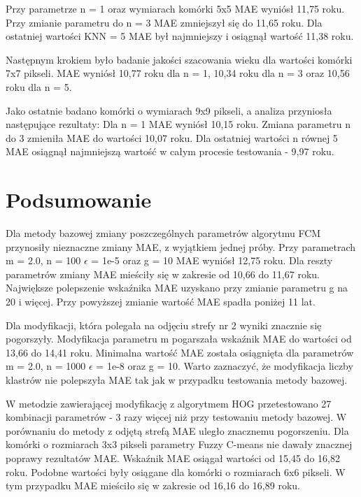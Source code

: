 \documentclass[a4paper,twoside,12pt]{book}
\begin{document}
    Przy parametrze n = 1 oraz wymiarach komórki 5x5 MAE wyniósł 11,75 roku. Przy zmianie parametru do n = 3 MAE
    zmniejszył się do 11,65 roku. Dla ostatniej wartości KNN = 5 MAE był najmniejszy i osiągnął wartość 11,38 roku.

    Następnym krokiem było badanie jakości szacowania wieku dla wartości komórki 7x7 pikseli.
    MAE wyniósł 10,77 roku dla n = 1, 10,34 roku dla n = 3 oraz 10,56 roku dla n = 5.

    Jako ostatnie badano komórki o wymiarach 9x9 pikseli, a analiza przyniosła następujące rezultaty:
    Dla n = 1 MAE wyniósł 10,15 roku. Zmiana parametru n do 3 zmieniła MAE do wartości 10,07 roku.
    Dla ostatniej wartości n równej 5 MAE osiągnął najmniejszą wartość w całym procesie testowania - 9,97 roku.


    \chapter{Podsumowanie}\label{ch:podsumowanie}
    Dla metody bazowej zmiany poszczególnych parametrów algorytmu FCM przynosiły nieznaczne zmiany MAE, z wyjątkiem
    jednej próby. Przy parametrach m = 2.0, n = 100 $\epsilon$ = 1e-5 oraz g = 10 MAE wyniósł 12,75 roku. Dla reszty
    parametrów zmiany MAE mieściły się w zakresie od 10,66 do 11,67 roku. Największe polepszenie wskaźnika MAE uzyskano
    przy zmianie parametru g na 20 i więcej. Przy powyższej zmianie wartość MAE spadła poniżej 11 lat.

    Dla modyfikacji, która polegała na odjęciu strefy nr 2 wyniki znacznie się pogorszyły. Modyfikacja parametru m
    pogarszała wskaźnik MAE do wartości od 13,66 do 14,41 roku. Minimalna wartość MAE została osiągnięta dla parametrów
    m = 2.0, n = 1000 $\epsilon$ = 1e-8 oraz g = 10. Warto zaznaczyć, że modyfikacja liczby klastrów nie polepszyła
    MAE tak jak w przypadku testowania metody bazowej.

    W metodzie zawierającej modyfikację z algorytmem HOG przetestowano 27 kombinacji parametrów - 3 razy więcej niż przy
    testowaniu metody bazowej. W porównaniu do metody z odjętą strefą MAE uległo znacznemu pogorszeniu. Dla komórki o
    rozmiarach 3x3 pikseli parametry Fuzzy C-means nie dawały znacznej
    poprawy rezultatów MAE. Wskaźnik MAE osiągał wartości od 15,45 do 16,82 roku. Podobne wartości były osiągane dla
    komórki o rozmiarach 6x6 pikseli. W tym przypadku MAE mieściło się w zakresie od 16,16 do 16,89 roku.
\end{document}
